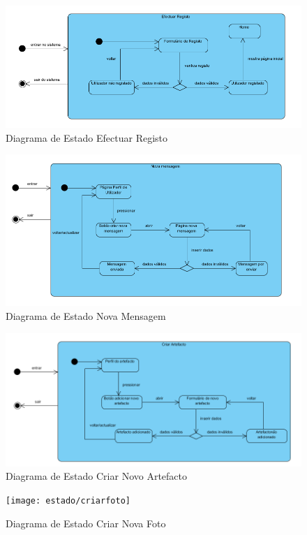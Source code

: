﻿\documentclass[12pt,a4paper]{article}
\begin{document}
\begin{figure}[h!]
\centering
\includegraphics[scale=0.7]{estado/registo}
\caption{Diagrama de Estado Efectuar Registo} 
\end{figure} 

\begin{figure}[h!]
\centering
\includegraphics[scale=0.7]{estado/novamensagem}
\caption{Diagrama de Estado Nova Mensagem} 
\end{figure} 

\begin{figure}[h!]
\centering
\includegraphics[scale=0.7]{estado/criarartefacto}
\caption{Diagrama de Estado Criar Novo Artefacto} 
\end{figure} 

\begin{figure}[h!]
\centering
\texttt{[image: estado/criarfoto]}
\caption{Diagrama de Estado Criar Nova Foto} 
\end{figure} 
  
\end{document}
